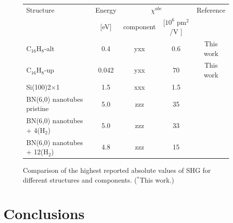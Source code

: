 \documentclass[pss]{wiley2sp} %
\begin{document}
\begin{figure}[htb]%
  \sidecaption
  \begin{tabular}{p{3.7cm}cccc}
  \hline
    Structure & Energy & \multicolumn{2}{c}{$\chi^{abc} $} &  Reference\\
    \cline{3-4}
              & [eV]   & component & [$10^{6} $ pm$^{2}$/V ] \\
    \hline
    C$_{16}$H$_{8}$-alt             & 0.4   & yxx   & 0.6   & This work     \\
    C$_{16}$H$_{8}$-up              & 0.042 & yxx   & 70    & This work     \\
    Si(100)2$\times$1               & 1.5   & xxx   & 1.5   & \cite{andersonPRB15} \ \\
    BN(6,0) nanotubes pristine      & 5.0   & zzz   & 35    & \cite{salazar2014molecular} \\
    BN(6,0) nanotubes + 4(H$_{2}$)  & 5.0   & zzz   & 33    & \cite{salazar2014molecular} \\
    BN(6,0) nanotubes + 12(H$_{2}$) & 4.8   & zzz   & 15    & \cite{salazar2014molecular} \\
  \hline
  \end{tabular}
  \caption[]{%
  Comparison of the highest reported absolute values of SHG for 
    different structures and components. ($^{*}$This work.)}
  \label{tab:shgcomp}
\end{figure}




\section{Conclusions} %
\label{sec:conclusions}
\end{document}
